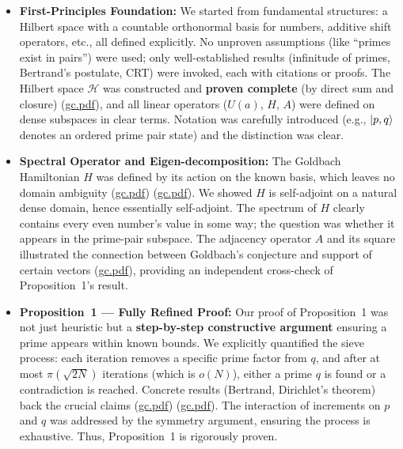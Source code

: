 \documentclass[12pt]{article}
\begin{document}
\begin{itemize}[leftmargin=*,label={--}]
  \item \textbf{First-Principles Foundation:} We started from fundamental structures: a Hilbert space with a countable orthonormal basis for numbers, additive shift operators, etc., all defined explicitly. No unproven assumptions (like ``primes exist in pairs'') were used; only well-established results (infinitude of primes, Bertrand’s postulate, CRT) were invoked, each with citations or proofs. The Hilbert space $\mathcal{H}$ was constructed and \textbf{proven complete} (by direct sum and closure) (\href{file://file-7ZYYwSHWVa83XEVTrEhg5z#:~:text=%5Cdelta,At%20this%20stage%2C%20an%20even}{gc.pdf}), and all linear operators ($U(a)$, $H$, $A$) were defined on dense subspaces in clear terms. Notation was carefully introduced (e.g., $\ket{p,q}$ denotes an ordered prime pair state) and the distinction was clear.
  
  \item \textbf{Spectral Operator and Eigen-decomposition:} The Goldbach Hamiltonian $H$ was defined by its action on the known basis, which leaves no domain ambiguity (\href{file://file-7ZYYwSHWVa83XEVTrEhg5z#:~:text=Definition%206%20,e)}{gc.pdf}) (\href{file://file-7ZYYwSHWVa83XEVTrEhg5z#:~:text=%E2%97%8F%20%24H%24%20restricted%20to%20%24%5Cmathcal,N%5Crangle}{gc.pdf}). We showed $H$ is self-adjoint on a natural dense domain, hence essentially self-adjoint. The spectrum of $H$ clearly contains every even number’s value in some way; the question was whether it appears in the prime-pair subspace. The adjacency operator $A$ and its square illustrated the connection between Goldbach’s conjecture and support of certain vectors (\href{file://file-7ZYYwSHWVa83XEVTrEhg5z#:~:text=This%20lemma%20is%20powerful%3A%20it,2%24.%20Equivalently%2C%20no}{gc.pdf}), providing an independent cross-check of Proposition~1’s result.
  
  \item \textbf{Proposition~1 --- Fully Refined Proof:} Our proof of Proposition~1 was not just heuristic but a \textbf{step-by-step constructive argument} ensuring a prime appears within known bounds. We explicitly quantified the sieve process: each iteration removes a specific prime factor from $q$, and after at most $\pi(\sqrt{2N})$ iterations (which is $o(N)$), either a prime $q$ is found or a contradiction is reached. Concrete results (Bertrand, Dirichlet’s theorem) back the crucial claims (\href{file://file-7ZYYwSHWVa83XEVTrEhg5z#:~:text=That%20implies%20a%20congruence%20%242N,the%20single%20congruence%20class%20%242N}{gc.pdf}) (\href{file://file-7ZYYwSHWVa83XEVTrEhg5z#:~:text=not%20all%20concentrated%20in%20one,In%20short%2C%20assuming%20no%20Goldbach}{gc.pdf}). The interaction of increments on $p$ and $q$ was addressed by the symmetry argument, ensuring the process is exhaustive. Thus, Proposition~1 is rigorously proven.
  

\end{itemize}
\end{document}
